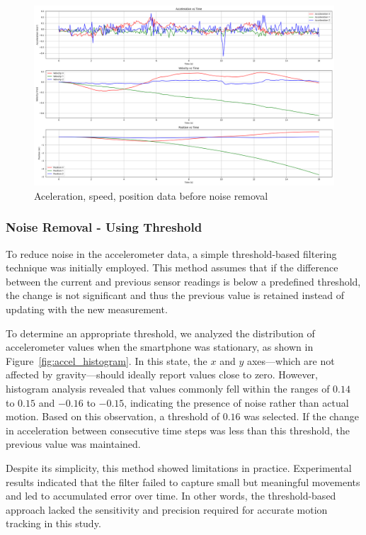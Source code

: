 \documentclass{article}
\begin{document}
    \FloatBarrier
    \begin{figure}[ht]
        \centering
        \includegraphics[width=\textwidth]{2_1_6_1.png}
        \caption{Aceleration, speed, position data before noise removal}
        \label{fig:integration_drift}
    \end{figure}

    \FloatBarrier
    \subsubsection{Noise Removal - Using Threshold}

    To reduce noise in the accelerometer data, a simple threshold-based filtering
    technique was initially employed. This method assumes that if the difference
    between the current and previous sensor readings is below a predefined
    threshold, the change is not significant and thus the previous value is retained
    instead of updating with the new measurement.

    To determine an appropriate threshold, we analyzed the distribution of
    accelerometer values when the smartphone was stationary, as shown in Figure~\ref{fig:accel_histogram}.
    In this state, the $x$ and $y$ axes—which are not affected by gravity—should
    ideally report values close to zero. However, histogram analysis revealed that
    values commonly fell within the ranges of $0.14$ to $0.15$ and $-0.16$ to $-0
    .15$, indicating the presence of noise rather than actual motion. Based on this
    observation, a threshold of $0.16$ was selected. If the change in acceleration
    between consecutive time steps was less than this threshold, the previous
    value was maintained.

    Despite its simplicity, this method showed limitations in practice.
    Experimental results indicated that the filter failed to capture small but
    meaningful movements and led to accumulated error over time. In other words,
    the threshold-based approach lacked the sensitivity and precision required
    for accurate motion tracking in this study.
\end{document}
